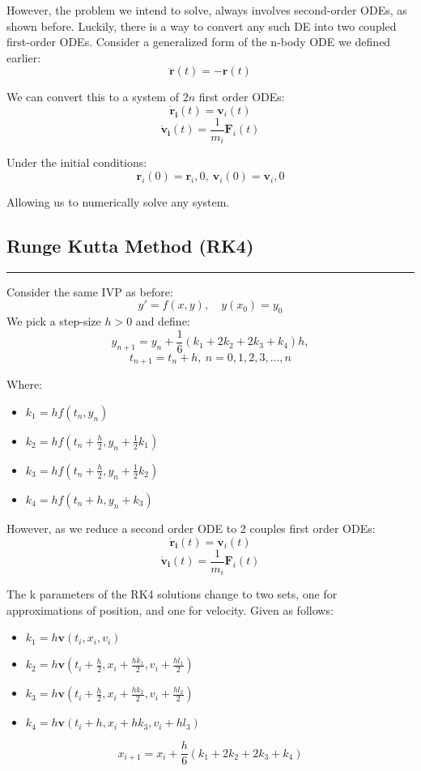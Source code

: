 \documentclass[hidelinks, 11pt, dvipsnames]{article}
\newcommand{\psubsection}[1]{{
    \begin{center}
        \section*{\Large #1}
        \noindent \rule{17cm}{0.2pt}
    \end{center}
}}
\begin{document}
    However, the problem we intend to solve, always involves second-order ODEs, as shown before. Luckily, there is a way to convert any such DE into two coupled first-order ODEs. Consider a generalized form of the n-body ODE we defined earlier:
    $$  \mathbf{\ddot{r}}(t) = -\mathbf{r}(t) $$

    We can convert this to a system of $2n$ first order ODEs:
    $$  \mathbf{\dot{r}_i}(t) = \mathbf{v}_i(t)$$
    $$\mathbf{\dot{v}_i}(t) = \frac{1}{m_i}\mathbf{F}_i(t)$$

    Under the initial conditions:
    $$ \mathbf{r}_i(0) = \mathbf{r}_i,0, \ \mathbf{v}_i(0) = \mathbf{v}_i,0 $$

    Allowing us to numerically solve any system.

    \psubsection{Runge Kutta Method (RK4)}
    Consider the same IVP as before:
    $$ \label{eq:3.1.1} y'=f(x,y),\quad y(x_0)=y_0 $$
    We pick a step-size $h>0$ and define:
    $$ y_{n+1} = y_n + \frac{1}{6}(k_1 + 2k_2 + 2k_3 + k_4)h, $$
    $$ t_{n+1} = t_n + h, \ n= 0,1,2,3,...,n $$

    Where:
    \begin{itemize}
        \item $k_{1}=h f\left(t_{n}, y_{n}\right)$
        \item $k_{2}=h f\left(t_{n}+\frac{h}{2}, y_{n}+\frac{1}{2} k_{1}\right)$
        \item $k_{3}=h f\left(t_{n}+\frac{h}{2}, y_{n}+\frac{1}{2} k_{2}\right)$
        \item $k_{4}=h f\left(t_{n}+h, y_{n}+k_{3}\right)$
    \end{itemize}

    However, as we reduce a second order ODE to 2 couples first order ODEs:
    $$  \mathbf{\dot{r}_i}(t) = \mathbf{v}_i(t)$$
    $$\mathbf{\dot{v}_i}(t) = \frac{1}{m_i}\mathbf{F}_i(t)$$

    The k parameters of the RK4 solutions change to two sets, one for approximations of position, and one for velocity. Given as follows:
    \begin{itemize}
        \item $k_{1}=h \mathbf{v}\left(t_{i}, x_{i}, v_{i}\right)$
        \item $k_{2}=h \mathbf{v}\left(t_{i} + \frac{h}{2}, x_{i} +\frac{hk_1}{2}, v_{i}+\frac{hl_1}{2}\right)$
        \item $k_{3}=h \mathbf{v}\left(t_{i} + \frac{h}{2}, x_{i} +\frac{hk_2}{2}, v_{i}+\frac{hl_2}{2}\right)$
        \item $k_{4}=h \mathbf{v}\left(t_{i}+h, x_{i}+hk_3, v_{i}+hl_3\right)$
    \end{itemize}
    $$ x_{i+1} = x_i + \frac{h}{6} \left( k_1 + 2k_2 + 2k_3 + k_4 \right) $$
\end{document}
